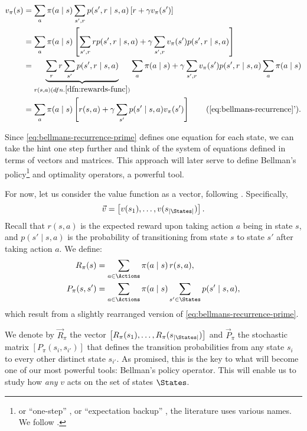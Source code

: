 \begin{align}
\label{eq:bellmans-recurrence-prime}
v_\pi(s) &= \sum_{a} \pi(a \mid s) \sum_{s', r} p(s', r \mid s, a) \left[ r + \gamma v_\pi (s') \right] \nonumber \\
&= \sum_{a} \pi(a \mid s) \left[ \sum_{s', r} r p(s', r \mid s, a) + \gamma \sum_{s', r} v_\pi (s') p(s', r \mid s,a) \right] \nonumber \\
&= \underbrace{\sum_{r} r \sum_{s'} p(s', r \mid s, a)}_{r(s,a) (dfn. \ref{dfn:rewards-func})} \sum_a \pi(a \mid s) + \gamma \sum_{s', r} v_\pi (s') p(s', r \mid s, a) \sum_{a} \pi(a \mid s) \nonumber \\
&= \sum_{a} \pi(a \mid s) \left[ r(s,a) + \gamma \sum_{s'} p(s' \mid s, a) v_\pi (s') \right] \tag{\ref{eq:bellmans-recurrence}'}.
\end{align}

Since \eqref{eq:bellmans-recurrence-prime} defines one equation for each state,
we can take the hint one step further and think of the system of equations
defined in terms of vectors and matrices. This approach will later serve to
define Bellman's policy\footnote{or ``one-step'' \cite[pg.~9]{nadeemward2021},
or ``expectation backup'' \cite[Lect.~3, Contraction Mapping]{silver2015}, the
literature uses various names. We follow
\cite{rao2022}.} and optimality operators, a powerful tool.

For now, let us consider the value function as a vector, following
\cite[pg.~132]{raoRL4F}. Specifically,
\begin{equation*}
    \vec{v} = \left[ v (s_1), \dots , v (s_{|\States|}) \right].
\end{equation*}
Recall that $r(s, a)$ is the expected reward upon taking action $a$ being in
state $s$, and $p(s' \mid s, a)$ is the probability of transitioning from state
$s$ to state $s'$ after taking action $a$. We define:
\begin{align*}
    R_\pi (s) &= \sum_{a \in \Actions} \pi(a \mid s) \, r(s,a), \\
    P_\pi (s, s') &= \sum_{a \in \Actions} \pi(a \mid s) \sum_{s' \in \States} p(s' \mid s, a),
\end{align*}
which result from a slightly rearranged version of
\eqref{eq:bellmans-recurrence-prime}.

We denote by $\vec{R}_\pi$ the vector $\left[ R_\pi(s_1), \dots, R_\pi
(s_{|\States|}) \right]$ and $\vec{P}_\pi$ the stochastic matrix $\left[
P_\pi(s_i, s_{i'}) \right]$ that defines the transition probabilities from any
state $s_i$ to every other distinct state $s_{i'}$. As promised, this is the key
to what will become one of our most powerful tools: Bellman's policy operator.
This will enable us to study how \textit{any} $v$ acts on the set of states
$\States$.

